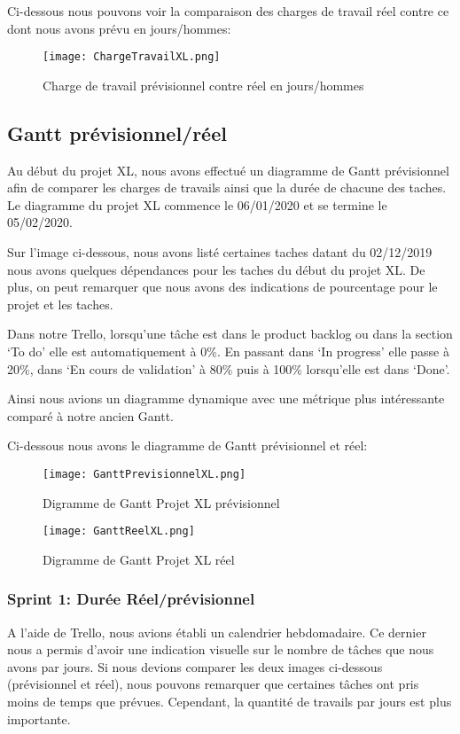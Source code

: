 Ci-dessous nous pouvons voir la comparaison des charges de travail réel contre ce dont nous avons prévu en jours/hommes: 

\begin{figure}[h!]
  \centering
  \texttt{[image: ChargeTravailXL.png]}
	\caption[]{Charge de travail prévisionnel contre réel en jours/hommes}
	\label{}
\end{figure}



\subsection{Gantt prévisionnel/réel}
Au début du projet XL, nous avons effectué un diagramme de Gantt prévisionnel afin de comparer les charges de travails ainsi que la durée de chacune des taches.
Le diagramme du projet XL commence le 06/01/2020 et se termine le 05/02/2020. 

Sur l'image ci-dessous, nous avons listé certaines taches datant du 02/12/2019 nous avons quelques dépendances pour les taches du début du projet XL\@.
De plus, on peut remarquer que nous avons des indications de pourcentage pour le projet et les taches.

Dans notre Trello, lorsqu'une tâche est dans le product backlog ou dans la section `To do' elle est automatiquement à 0\%.
En passant dans `In progress' elle passe à 20\%, dans `En cours de validation' à 80\% puis à 100\% lorsqu'elle est dans `Done'.

Ainsi nous avions un diagramme dynamique avec une métrique plus intéressante comparé à notre ancien Gantt.

Ci-dessous nous avons le diagramme de Gantt prévisionnel et réel: 

\begin{figure}[h!]
  \centering
  \texttt{[image: GanttPrevisionnelXL.png]}
	\caption[]{Digramme de Gantt Projet XL prévisionnel}
	\label{}
\end{figure}

\begin{figure}[h!]
  \centering
  \texttt{[image: GanttReelXL.png]}
	\caption[]{Digramme de Gantt Projet XL réel}
	\label{}
\end{figure}


\subsubsection{Sprint 1: Durée Réel/prévisionnel}
A l'aide de Trello, nous avions établi un calendrier hebdomadaire.
Ce dernier nous a permis d’avoir une indication visuelle sur le nombre de tâches que nous avons par jours.
Si nous devions comparer les deux images ci-dessous (prévisionnel et réel), nous pouvons remarquer que certaines tâches ont pris moins de temps que prévues.
Cependant, la quantité de travails par jours est plus importante.


